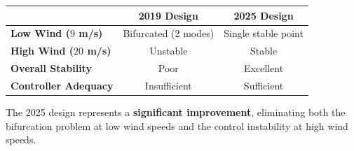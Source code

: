 \begin{table}[h]
\centering
\begin{tabular}{lcc}
\hline
& \textbf{2019 Design} & \textbf{2025 Design} \\
\hline
\textbf{Low Wind ($9$ m/s)} & Bifurcated (2 modes) & Single stable point \\
\textbf{High Wind ($20$ m/s)} & Unstable & Stable \\
\textbf{Overall Stability} & Poor & Excellent \\
\textbf{Controller Adequacy} & Insufficient & Sufficient \\
\hline
\end{tabular}
\end{table}

The 2025 design represents a \textbf{significant improvement}, eliminating both the bifurcation problem at low wind speeds and the control instability at high wind speeds.